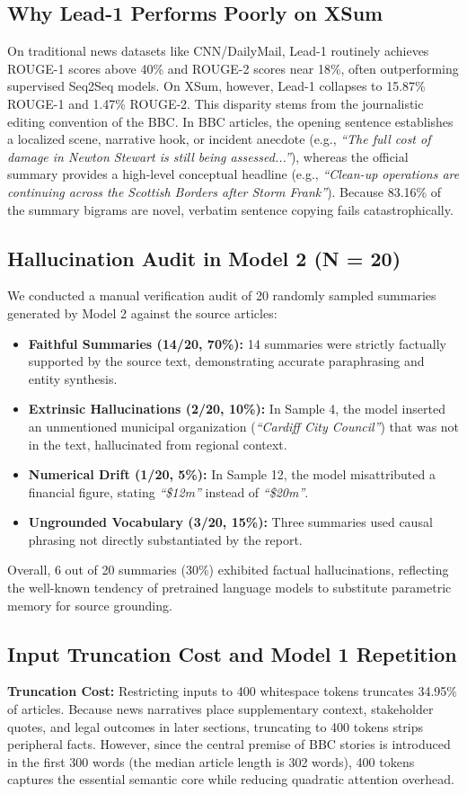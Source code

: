 \documentclass[conference]{IEEEtran}
\begin{document}
\subsection{Why Lead-1 Performs Poorly on XSum}
On traditional news datasets like CNN/DailyMail, Lead-1 routinely achieves ROUGE-1 scores above 40\% and ROUGE-2 scores near 18\%, often outperforming supervised Seq2Seq models. On XSum, however, Lead-1 collapses to 15.87\% ROUGE-1 and 1.47\% ROUGE-2. This disparity stems from the journalistic editing convention of the BBC. In BBC articles, the opening sentence establishes a localized scene, narrative hook, or incident anecdote (e.g., \textit{``The full cost of damage in Newton Stewart is still being assessed...''}), whereas the official summary provides a high-level conceptual headline (e.g., \textit{``Clean-up operations are continuing across the Scottish Borders after Storm Frank''}). Because 83.16\% of the summary bigrams are novel, verbatim sentence copying fails catastrophically.

\subsection{Hallucination Audit in Model 2 (N = 20)}
We conducted a manual verification audit of 20 randomly sampled summaries generated by Model 2 against the source articles:
\begin{itemize}
\item \textbf{Faithful Summaries (14/20, 70\%):} 14 summaries were strictly factually supported by the source text, demonstrating accurate paraphrasing and entity synthesis.
\item \textbf{Extrinsic Hallucinations (2/20, 10\%):} In Sample 4, the model inserted an unmentioned municipal organization (\textit{``Cardiff City Council''}) that was not in the text, hallucinated from regional context.
\item \textbf{Numerical Drift (1/20, 5\%):} In Sample 12, the model misattributed a financial figure, stating \textit{``\$12m''} instead of \textit{``\$20m''}.
\item \textbf{Ungrounded Vocabulary (3/20, 15\%):} Three summaries used causal phrasing not directly substantiated by the report.
\end{itemize}
Overall, 6 out of 20 summaries (30\%) exhibited factual hallucinations, reflecting the well-known tendency of pretrained language models to substitute parametric memory for source grounding.

\subsection{Input Truncation Cost and Model 1 Repetition}
\textbf{Truncation Cost:} Restricting inputs to 400 whitespace tokens truncates 34.95\% of articles. Because news narratives place supplementary context, stakeholder quotes, and legal outcomes in later sections, truncating to 400 tokens strips peripheral facts. However, since the central premise of BBC stories is introduced in the first 300 words (the median article length is 302 words), 400 tokens captures the essential semantic core while reducing quadratic attention overhead.
\end{document}
